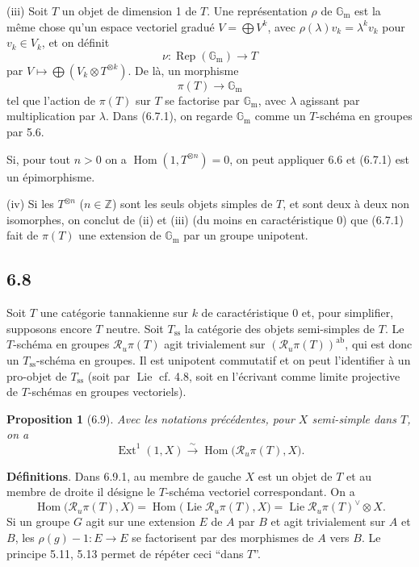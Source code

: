 \documentclass[12pt,a4paper]{article}
\theoremstyle{plain}
\newtheorem{proposition}[theorem]{Proposition}
\theoremstyle{definition}
\theoremstyle{remark}
\DeclareMathOperator{\Hom}{Hom}
\DeclareMathOperator{\Ext}{Ext}
\DeclareMathOperator{\Lie}{Lie}
\DeclareMathOperator{\Rep}{Rep}
\newcommand{\ab}{\mathrm{ab}}
\newcommand{\Z}{\mathbb{Z}}
\newcommand{\Gm}{\mathbb{G}_\mathrm{m}}
\begin{document}
(iii) Soit $T$ un objet de dimension 1 de $T$. Une représentation $\rho$ de $\Gm$ est la même chose qu'un espace vectoriel gradué $V = 
\bigoplus V^k$, avec $\rho(\lambda)v_k = 
\lambda^k v_k$ pour $v_k 
\in V_k$, et on définit
\[
\nu: 
\Rep(\Gm) 
\longrightarrow T
\]
par $V 
\mapsto 
\bigoplus (V_k 
\otimes T^{\otimes k})$. De là, un morphisme
\begin{equation*}\tag{6.7.1}
\pi(T) 
\longrightarrow 
\Gm
\end{equation*}
tel que l'action de $\pi(T)$ sur $T$ se factorise par $\Gm$, avec $\lambda$ agissant par multiplication par $\lambda$. Dans (6.7.1), on regarde $\Gm$ comme un $T$-schéma en groupes par 5.6.

Si, pour tout $n > 0$ on a $\Hom(1, T^{\otimes n}) = 0$, on peut appliquer 6.6 et (6.7.1) est un épimorphisme.

(iv) Si les $T^{\otimes n}$ ($n 
\in 
\Z$) sont les seuls objets simples de $T$, et sont deux à deux non isomorphes, on conclut de (ii) et (iii) (du moins en caractéristique 0) que (6.7.1) fait de $\pi(T)$ une extension de $\Gm$ par un groupe unipotent.

\subsection*{6.8}
Soit $T$ une catégorie tannakienne sur $k$ de caractéristique 0 et, pour simplifier, supposons encore $T$ neutre. Soit $T_{\mathrm{ss}}$ la catégorie des objets semi-simples de $T$. Le $T$-schéma en groupes $\mathcal{R}_u\pi(T)$ agit trivialement sur $(\mathcal{R}_u\pi(T))^{\ab}$, qui est donc un $T_{\mathrm{ss}}$-schéma en groupes. Il est unipotent commutatif et on peut l'identifier à un pro-objet de $T_{\mathrm{ss}}$ (soit par $\Lie$ cf. 4.8, soit en l'écrivant comme limite projective de $T$-schémas en groupes vectoriels).

\begin{proposition}[6.9]\label{prop:6.9}
Avec les notations précédentes, pour $X$ semi-simple dans $T$, on a
\begin{equation*}\tag{6.9.1}
\Ext^1(1,X) 
\xrightarrow{\sim} 
\Hom\bigl(\mathcal{R}_u\pi(T), X\bigr).
\end{equation*}
\end{proposition}

\textbf{Définitions}. Dans 6.9.1, au membre de gauche $X$ est un objet de $T$ et au membre de droite il désigne le $T$-schéma vectoriel correspondant. On a
\[
\Hom\bigl(\mathcal{R}_u\pi(T), X\bigr) = 
\Hom\bigl(\Lie\mathcal{R}_u\pi(T), X\bigr) = 
\Lie\mathcal{R}_u\pi(T)^\vee 
\otimes X.
\]
Si un groupe $G$ agit sur une extension $E$ de $A$ par $B$ et agit trivialement sur $A$ et $B$, les $\rho(g)-1: E 
\to E$ se factorisent par des morphismes de $A$ vers $B$. Le principe 5.11, 5.13 permet de répéter ceci ``dans $T$''.
\end{document}
